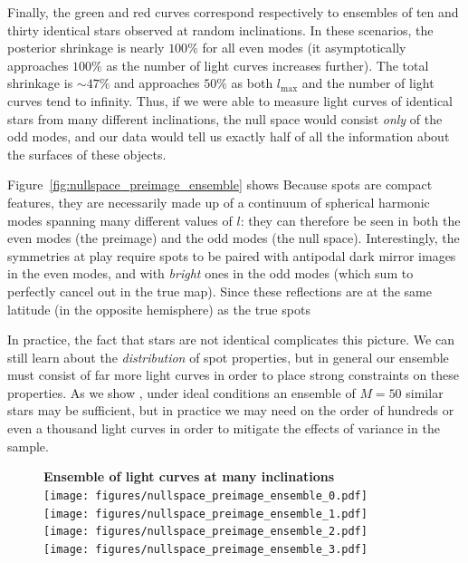 \documentclass[modern]{aastex62}
\begin{document}
Finally, the green and red curves correspond respectively to ensembles of ten and thirty
identical stars observed at random inclinations.
In these scenarios, the posterior shrinkage
is nearly $100\%$
for all even modes (it asymptotically approaches $100\%$ as the number
of light curves increases further). The total shrinkage is $\sim 47\%$
and approaches $50\%$ as both $l_\mathrm{max}$  and the number of light curves
tend to infinity. Thus, if we were able to measure light curves of identical stars
from many different inclinations, the null space would consist \emph{only}
of the odd modes, and our data would tell us exactly half of all the
information about the surfaces of these objects.

Figure~\ref{fig:nullspace_preimage_ensemble} shows 
Because spots are compact features, they
are necessarily made up of a continuum of spherical harmonic modes spanning
many different values of $l$: they can therefore be seen in both the even
modes (the preimage) and the odd modes (the null space). Interestingly,
the symmetries at play require spots to be paired with antipodal dark mirror
images in the even modes, and with \emph{bright} ones in the odd modes
(which sum to perfectly cancel out in the true map). Since these reflections
are at the same latitude (in the opposite hemisphere) as the true spots

In practice, the fact that stars are not identical complicates this picture.
We can still learn about the \emph{distribution} of spot properties, but
in general our ensemble must consist of far more light curves in order to
place strong constraints on these properties. As we
show ,
under ideal conditions an ensemble of $M = 50$ similar stars may be sufficient,
but in practice we may need on the order of hundreds or even a thousand light curves
in order to mitigate the effects of variance in the sample.

\begin{figure}[p!]
    \begin{centering}
        \textbf{Ensemble of light curves at many inclinations}
        \\[1em]
        \texttt{[image: figures/nullspace\_preimage\_ensemble\_0.pdf]}
        \\[1em]
        \texttt{[image: figures/nullspace\_preimage\_ensemble\_1.pdf]}
        \\[1em]
        \texttt{[image: figures/nullspace\_preimage\_ensemble\_2.pdf]}
        \\[1em]
        \texttt{[image: figures/nullspace\_preimage\_ensemble\_3.pdf]}
    \end{centering}
\end{figure}
\end{document}
